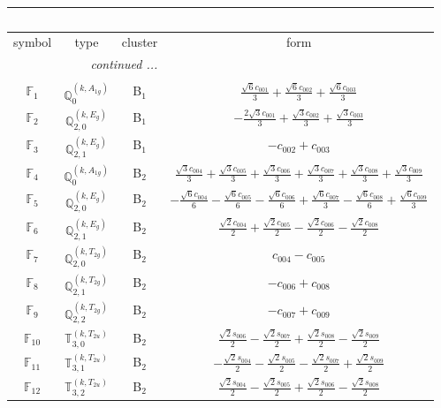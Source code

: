 \documentclass[fleqn,10pt,landscape]{article}
\begin{document}
\begin{itemize}
\begin{center}
\begin{longtable}{c|c|c|c}
\multicolumn{3}{l}{\tablename\ \thetable{}} \\
 \hline \hline
symbol & type & cluster & form \\ \hline \endhead

 \hline \hline
\multicolumn{3}{r}{\footnotesize\it continued ...} \\ \endfoot

 \hline \hline
\multicolumn{3}{r}{} \\ \endlastfoot

$ \mathbb{F}_{1} $ & $\mathbb{Q}_{0}^{(k,A_{1g})}$ & B$_{1}$ & $\frac{\sqrt{6} c_{001}}{3} + \frac{\sqrt{6} c_{002}}{3} + \frac{\sqrt{6} c_{003}}{3}$ \\
$ \mathbb{F}_{2} $ & $\mathbb{Q}_{2,0}^{(k,E_{g})}$ & B$_{1}$ & $- \frac{2 \sqrt{3} c_{001}}{3} + \frac{\sqrt{3} c_{002}}{3} + \frac{\sqrt{3} c_{003}}{3}$ \\
$ \mathbb{F}_{3} $ & $\mathbb{Q}_{2,1}^{(k,E_{g})}$ & B$_{1}$ & $- c_{002} + c_{003}$ \\ \hline
$ \mathbb{F}_{4} $ & $\mathbb{Q}_{0}^{(k,A_{1g})}$ & B$_{2}$ & $\frac{\sqrt{3} c_{004}}{3} + \frac{\sqrt{3} c_{005}}{3} + \frac{\sqrt{3} c_{006}}{3} + \frac{\sqrt{3} c_{007}}{3} + \frac{\sqrt{3} c_{008}}{3} + \frac{\sqrt{3} c_{009}}{3}$ \\
$ \mathbb{F}_{5} $ & $\mathbb{Q}_{2,0}^{(k,E_{g})}$ & B$_{2}$ & $- \frac{\sqrt{6} c_{004}}{6} - \frac{\sqrt{6} c_{005}}{6} - \frac{\sqrt{6} c_{006}}{6} + \frac{\sqrt{6} c_{007}}{3} - \frac{\sqrt{6} c_{008}}{6} + \frac{\sqrt{6} c_{009}}{3}$ \\
$ \mathbb{F}_{6} $ & $\mathbb{Q}_{2,1}^{(k,E_{g})}$ & B$_{2}$ & $\frac{\sqrt{2} c_{004}}{2} + \frac{\sqrt{2} c_{005}}{2} - \frac{\sqrt{2} c_{006}}{2} - \frac{\sqrt{2} c_{008}}{2}$ \\
$ \mathbb{F}_{7} $ & $\mathbb{Q}_{2,0}^{(k,T_{2g})}$ & B$_{2}$ & $c_{004} - c_{005}$ \\
$ \mathbb{F}_{8} $ & $\mathbb{Q}_{2,1}^{(k,T_{2g})}$ & B$_{2}$ & $- c_{006} + c_{008}$ \\
$ \mathbb{F}_{9} $ & $\mathbb{Q}_{2,2}^{(k,T_{2g})}$ & B$_{2}$ & $- c_{007} + c_{009}$ \\
$ \mathbb{F}_{10} $ & $\mathbb{T}_{3,0}^{(k,T_{2u})}$ & B$_{2}$ & $\frac{\sqrt{2} s_{006}}{2} - \frac{\sqrt{2} s_{007}}{2} + \frac{\sqrt{2} s_{008}}{2} - \frac{\sqrt{2} s_{009}}{2}$ \\
$ \mathbb{F}_{11} $ & $\mathbb{T}_{3,1}^{(k,T_{2u})}$ & B$_{2}$ & $- \frac{\sqrt{2} s_{004}}{2} - \frac{\sqrt{2} s_{005}}{2} - \frac{\sqrt{2} s_{007}}{2} + \frac{\sqrt{2} s_{009}}{2}$ \\
$ \mathbb{F}_{12} $ & $\mathbb{T}_{3,2}^{(k,T_{2u})}$ & B$_{2}$ & $\frac{\sqrt{2} s_{004}}{2} - \frac{\sqrt{2} s_{005}}{2} + \frac{\sqrt{2} s_{006}}{2} - \frac{\sqrt{2} s_{008}}{2}$ \\
\end{longtable}
\end{center}


\end{itemize}
\end{document}
